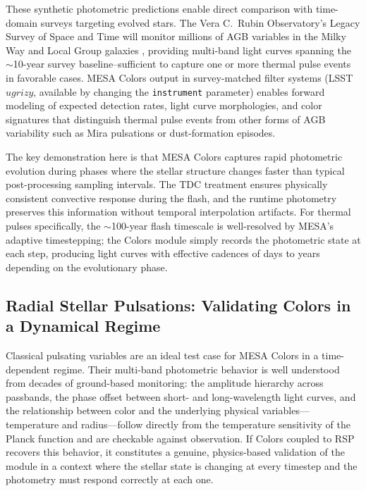 \documentclass[linenumbers,apj,twocolumn, floatfix]{aastex701}
\begin{document}
These synthetic photometric predictions enable direct comparison with time-domain surveys targeting evolved stars.
The Vera C.\ Rubin Observatory's Legacy Survey of Space and Time will monitor millions of AGB variables in the Milky Way and Local Group galaxies \citep{LSST}, providing multi-band light curves spanning the $\sim$10-year survey baseline--sufficient to capture one or more thermal pulse events in favorable cases.
MESA Colors output in survey-matched filter systems (LSST $ugrizy$, available by changing the \texttt{instrument} parameter) enables forward modeling of expected detection rates, light curve morphologies, and color signatures that distinguish thermal pulse events from other forms of AGB variability such as Mira pulsations or dust-formation episodes.

The key demonstration here is that MESA Colors captures rapid photometric evolution during phases where the stellar structure changes faster than typical post-processing sampling intervals.
The TDC treatment ensures physically consistent convective response during the flash, and the runtime photometry preserves this information without temporal interpolation artifacts.
For thermal pulses specifically, the $\sim$100-year flash timescale is well-resolved by MESA's adaptive timestepping; the Colors module simply records the photometric state at each step, producing light curves with effective cadences of days to years depending on the evolutionary phase.




\subsection{Radial Stellar Pulsations: Validating Colors in a Dynamical Regime}
\label{sec:demo_rsp}

Classical pulsating variables are an ideal test case for MESA Colors in a time-dependent
regime. Their multi-band photometric behavior is well understood from decades of
ground-based monitoring: the amplitude hierarchy across passbands, the phase offset between
short- and long-wavelength light curves, and the relationship between color and the
underlying physical variables—temperature and radius—follow directly from the temperature
sensitivity of the Planck function and are checkable against observation. If Colors coupled
to RSP recovers this behavior, it constitutes a genuine, physics-based validation of the
module in a context where the stellar state is changing at every timestep and the photometry
must respond correctly at each one.
\end{document}
